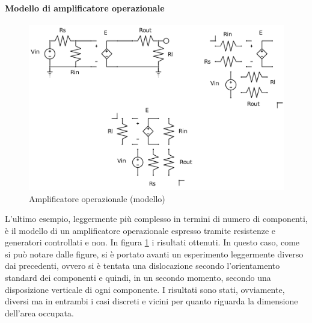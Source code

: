 \paragraph{Modello di amplificatore operazionale}
\begin{figure}[ht]
 \centering
 \includegraphics[scale=0.5]{immagini/ao.pdf}
 \caption{Amplificatore operazionale (modello)}
 \label{ao}
\end{figure}
L'ultimo esempio, leggermente più complesso in termini di numero di componenti, è il modello di un amplificatore operazionale espresso tramite resistenze e generatori controllati e non. In figura \ref{ao} i risultati ottenuti. In questo caso, come si può notare dalle figure, si è portato avanti un esperimento leggermente diverso dai precedenti, ovvero si è tentata una dislocazione secondo l'orientamento standard dei componenti e quindi, in un secondo momento, secondo una disposizione verticale di ogni componente. I risultati sono stati, ovviamente, diversi ma in entrambi i casi discreti e vicini per quanto riguarda la dimensione dell'area occupata.

